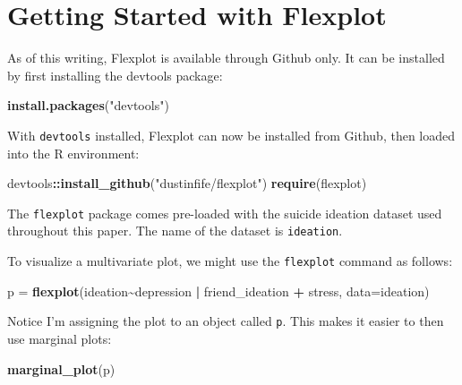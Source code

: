 \documentclass[
  man,floatsintext]{apa6}
\newenvironment{Shaded}{\begin{snugshade}}{\end{snugshade}}
\newcommand{\AttributeTok}[1]{\textcolor[rgb]{0.13,0.29,0.53}{#1}}
\newcommand{\FunctionTok}[1]{\textcolor[rgb]{0.13,0.29,0.53}{\textbf{#1}}}
\newcommand{\NormalTok}[1]{#1}
\newcommand{\OtherTok}[1]{\textcolor[rgb]{0.56,0.35,0.01}{#1}}
\newcommand{\SpecialCharTok}[1]{\textcolor[rgb]{0.81,0.36,0.00}{\textbf{#1}}}
\newcommand{\StringTok}[1]{\textcolor[rgb]{0.31,0.60,0.02}{#1}}
\begin{document}
\pagebreak

\section{Getting Started with Flexplot}\label{getting-started-with-flexplot}

As of this writing, Flexplot is available through Github only. It can be installed by first installing the devtools package:

\begin{Shaded}
\begin{Highlighting}[]
\FunctionTok{install.packages}\NormalTok{(}\StringTok{"devtools"}\NormalTok{)}
\end{Highlighting}
\end{Shaded}

With \texttt{devtools} installed, Flexplot can now be installed from Github, then loaded into the R environment:

\begin{Shaded}
\begin{Highlighting}[]
\NormalTok{devtools}\SpecialCharTok{::}\FunctionTok{install\_github}\NormalTok{(}\StringTok{"dustinfife/flexplot"}\NormalTok{)}
\FunctionTok{require}\NormalTok{(flexplot)}
\end{Highlighting}
\end{Shaded}

The \texttt{flexplot} package comes pre-loaded with the suicide ideation dataset used throughout this paper. The name of the dataset is \texttt{ideation}.

To visualize a multivariate plot, we might use the \texttt{flexplot} command as follows:

\begin{Shaded}
\begin{Highlighting}[]
\NormalTok{p }\OtherTok{=} \FunctionTok{flexplot}\NormalTok{(ideation}\SpecialCharTok{\textasciitilde{}}\NormalTok{depression }\SpecialCharTok{|}\NormalTok{ friend\_ideation }\SpecialCharTok{+}\NormalTok{ stress, }\AttributeTok{data=}\NormalTok{ideation)}
\end{Highlighting}
\end{Shaded}

Notice I'm assigning the plot to an object called \texttt{p}. This makes it easier to then use marginal plots:

\begin{Shaded}
\begin{Highlighting}[]
\FunctionTok{marginal\_plot}\NormalTok{(p)}
\end{Highlighting}
\end{Shaded}
\end{document}
